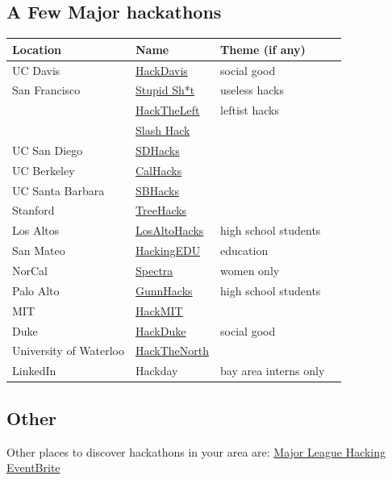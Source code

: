 \documentclass{article}
\begin{document}
\subsection{A Few Major hackathons}
\begin{center}
  \begin{tabular}{llll}
    \toprule
    Location & Name & Theme (if any) \\
    \midrule
    UC Davis & \href{https://hackdavis.io}{HackDavis} & social good \\
    San Francisco & \href{https://stupidhackathon.github.io}{Stupid Sh*t} & useless hacks \\
                  & \href{https://noisebridge.net/wiki/HackTheLeft}{HackTheLeft} & leftist hacks \\
                  & \href{https://hackerearth.com/slash-hack}{Slash Hack} & \\
    UC San Diego & \href{https://www.sdhacks.io}{SDHacks} & \\
    UC Berkeley & \href{http://calhacks.io}{CalHacks} & \\
    UC Santa Barbara & \href{http://www.sbhacks.com}{SBHacks} & \\
    Stanford & \href{https://www.treehacks.com}{TreeHacks} & \\
    Los Altos & \href{http://www.losaltoshacks.com}{LosAltoHacks} & high school students \\
    San Mateo & \href{http://hackingedu.co}{HackingEDU} & education \\
    NorCal & \href{http://sospectra.com}{Spectra} & women only \\
    Palo Alto & \href{https://gunnhacks.com}{GunnHacks} & high school students \\
    MIT & \href{https://hackmit.org}{HackMIT} & \\
    Duke & \href{https://www.hackduke.org}{HackDuke} & social good \\
    University of Waterloo & \href{https://hackthenorth.com}{HackTheNorth} & \\
    LinkedIn & Hackday & bay area interns only \\
    \bottomrule
  \end{tabular}
\end{center}

\subsection{Other}
Other places to discover hackathons in your area are:
\href{https://mlh.io}{Major League Hacking}
\href{http://eventbrite.com}{EventBrite}
\end{document}
